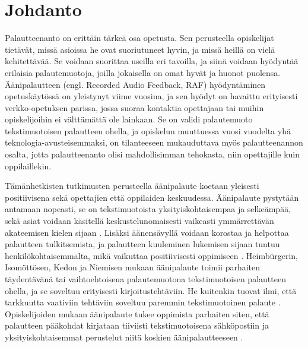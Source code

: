 \documentclass[utf8]{gradu3}
\begin{document}
\author{Erkko Mäkinen}


\maketitle


\mainmatter

\chapter{Johdanto}

Palautteenanto on erittäin tärkeä osa opetusta. Sen perusteella opiskelijat tietävät, missä asioissa he ovat suoriutuneet hyvin, ja missä heillä on vielä kehitettävää. Se voidaan suorittaa useilla eri tavoilla, ja siinä voidaan hyödyntää erilaisia palautemuotoja, joilla jokaisella on omat hyvät ja huonot puolensa. Äänipalautteen (engl. Recorded Audio Feedback, RAF) hyödyntäminen opetuskäytössä on yleistynyt viime vuosina, ja sen hyödyt on havaittu erityisesti verkko-opetuksen parissa, jossa suoraa kontaktia opettajaan tai muihin opiskelijoihin ei välttämättä ole lainkaan. Se on validi palautemuoto tekstimuotoisen palautteen ohella, ja opiskelun muuttuessa vuosi vuodelta yhä teknologia-avusteisemmaksi, on tilanteeseen mukauduttava myös palautteenannon osalta, jotta palautteenanto olisi mahdollisimman tehokasta, niin opettajille kuin oppilaillekin.

Tämänhetkisten tutkimusten perusteella äänipalaute koetaan yleisesti positiivisena sekä opettajien että oppilaiden keskuudessa. Äänipalaute pystytään antamaan nopeasti, se on tekstimuotoista yksityiskohtaisempaa ja selkeämpää, sekä asiat voidaan käsitellä keskustelunomaisesti vaikeasti ymmärrettävän akateemisen kielen sijaan \parencite{developing}. Lisäksi äänensävyllä voidaan korostaa ja helpottaa palautteen tulkitsemista, ja palautteen kuuleminen lukemisen sijaan tuntuu henkilökohtaisemmalta, mikä vaikuttaa positiivisesti oppimiseen \parencite{attitudes}. Heimbürgerin, Isomöttösen, Kedon ja Niemisen \parencite*{academics} mukaan äänipalaute toimii parhaiten täydentävänä tai vaihtoehtoisena palautemuotona tekstimuotoisen palautteen ohella, ja se soveltuu erityisesti kirjoitustehtäviin. He kuitenkin tuovat ilmi, että tarkkuutta vaativiin tehtäviin soveltuu paremmin tekstimuotoinen palaute \parencite{academics}. Opiskelijoiden mukaan äänipalaute tukee oppimista parhaiten siten, että palautteen pääkohdat kirjataan tiiviisti tekstimuotoisena sähköpostiin ja yksityiskohtaisemmat perustelut niitä koskien äänipalautteeseen \parencite{using}.
\end{document}
